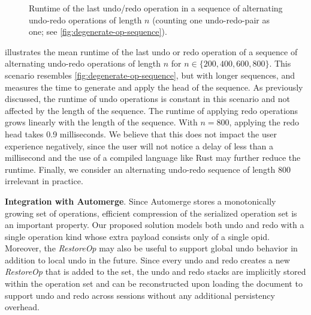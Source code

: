 \documentclass[sigplan,natbib=false,review]{acmart}
\newcommand{\restopkind}{\textit{RestoreOp}}
\begin{document}
\begin{figure}
\caption{
  Runtime of the last undo/redo operation
  in a sequence of alternating undo-redo operations of length $n$
  (counting one undo-redo-pair as one; see \cref{fig:degenerate-op-sequence}).
}\label{fig:runtime-undo-redo-alt}
\end{figure}

 illustrates the mean runtime of the last
undo or redo operation of a sequence of alternating undo-redo operations
of length $n$ for $n \in \{200, 400, 600, 800\}$.
This scenario resembles \cref{fig:degenerate-op-sequence}, but with longer sequences,
and measures the time to generate and apply the head of the sequence.
As previously discussed, the runtime of undo operations is constant in this
scenario and not affected by the length of the sequence.
The runtime of applying redo operations grows linearly with the length of the sequence.
With $n = 800$, applying the redo head takes 0.9 milliseconds.
We believe that this does not impact the user experience negatively,
since the user will not notice a delay of less than a millisecond and the use
of a compiled language like Rust may further reduce the runtime.
Finally, we consider an alternating undo-redo sequence of length 800 irrelevant
in practice.

\textbf{Integration with Automerge}.
Since Automerge stores a monotonically growing set of operations,
efficient compression of the serialized operation set is an important property.
Our proposed solution models both undo and redo with a single
operation kind whose extra payload consists only of a single \gls*{opid}.
Moreover, the \restopkind{} may also be useful to support global undo
behavior in addition to local undo in the future.
Since every undo and redo creates a new \restopkind{} that is added
to the set,
the undo and redo stacks are implicitly stored within the operation set and
can be reconstructed upon loading the document to support undo and redo
across sessions without any additional persistency overhead.
\end{document}
